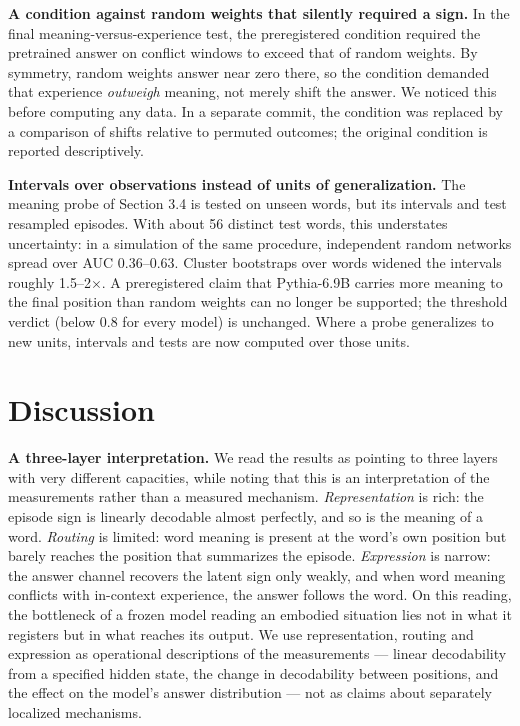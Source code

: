 \documentclass[11pt]{article}
\begin{document}
\textbf{A condition against random weights that silently required a sign.} In the final meaning-versus-experience test, the preregistered condition required the pretrained answer on conflict windows to exceed that of random weights. By symmetry, random weights answer near zero there, so the condition demanded that experience \emph{outweigh} meaning, not merely shift the answer. We noticed this before computing any data. In a separate commit, the condition was replaced by a comparison of shifts relative to permuted outcomes; the original condition is reported descriptively.

\textbf{Intervals over observations instead of units of generalization.} The meaning probe of Section 3.4 is tested on unseen words, but its intervals and test resampled episodes. With about 56 distinct test words, this understates uncertainty: in a simulation of the same procedure, independent random networks spread over AUC 0.36--0.63. Cluster bootstraps over words widened the intervals roughly 1.5--2$\times$. A preregistered claim that Pythia-6.9B carries more meaning to the final position than random weights can no longer be supported; the threshold verdict (below 0.8 for every model) is unchanged. Where a probe generalizes to new units, intervals and tests are now computed over those units.


\section{Discussion}

\textbf{A three-layer interpretation.} We read the results as pointing to three layers with very different capacities, while noting that this is an interpretation of the measurements rather than a measured mechanism. \emph{Representation} is rich: the episode sign is linearly decodable almost perfectly, and so is the meaning of a word. \emph{Routing} is limited: word meaning is present at the word's own position but barely reaches the position that summarizes the episode. \emph{Expression} is narrow: the answer channel recovers the latent sign only weakly, and when word meaning conflicts with in-context experience, the answer follows the word. On this reading, the bottleneck of a frozen model reading an embodied situation lies not in what it registers but in what reaches its output. We use representation, routing and expression as operational descriptions of the measurements --- linear decodability from a specified hidden state, the change in decodability between positions, and the effect on the model's answer distribution --- not as claims about separately localized mechanisms.
\end{document}
